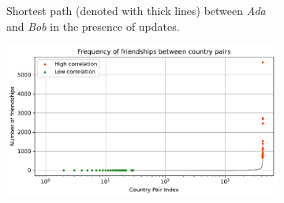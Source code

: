 \newsavebox{\largestimage}
\begin{figure}[htb]
    \begin{subfigure}{0.39\textwidth} 
        \centering
        \caption{
            Shortest path (denoted with thick lines) between \emph{Ada} and \emph{Bob} in the presence of updates.
        }
        \label{fig:paths}
    \end{subfigure}
    \hspace{2mm}
    \begin{subfigure}{0.58\textwidth}
        \centering
        \includegraphics[width=\linewidth]{figures/paramgen/paramgen-frequency-disc-countries}

\end{subfigure}
\end{figure}
